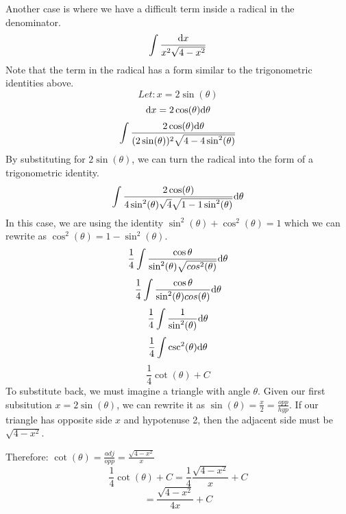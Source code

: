 \documentclass{math}
\begin{document}
Another case is where we have a difficult term inside a radical in the
denominator.
\[ \int{\frac{\mathrm{d}{x}}{x^{2}\sqrt{4-x^{2}}}} \]
Note that the term in the radical has a form similar to the trigonometric
identities above.
\[ Let: x = 2\sin(\theta) \]
\[ \mathrm{d}{x} = 2\cos(\theta)\mathrm{d}{\theta} \]
\[ \int{\frac{2\cos(\theta)\mathrm{d}{\theta}}
   {(2\sin(\theta))^{2}\sqrt{4-4\sin^{2}(\theta)}}} \]
By substituting for \( 2\sin(\theta) \), we can turn the radical into the form
of a trigonometric identity.
\[ \int{\frac{2\cos(\theta)}
  {4\sin^{2}(\theta)\sqrt{4}\sqrt{1-1\sin^{2}(\theta)}}\mathrm{d}{\theta}} \]
In this case, we are using the identity
\( \sin^{2}(\theta)+\cos^{2}(\theta) = 1 \) which we can rewrite as
\( \cos^{2}(\theta) = 1-\sin^{2}(\theta) \).
\[ \frac{1}{4}\int{\frac{\cos{\theta}}
   {\sin^{2}(\theta)\sqrt{cos^{2}(\theta)}}\mathrm{d}{\theta}} \]
\[ \frac{1}{4}\int{\frac{\cos{\theta}}
    {\sin^{2}(\theta)cos(\theta)}\mathrm{d}{\theta}} \]
\[ \frac{1}{4}\int{\frac{1}{\sin^{2}(\theta)}\mathrm{d}{\theta}} \]
\[ \frac{1}{4}\int{\csc^{2}(\theta)\mathrm{d}{\theta}} \]
\[ \frac{1}{4}\cot(\theta)+C \]
To substitute back, we must imagine a triangle with angle \( \theta \). Given
our first subsitution \( x = 2\sin(\theta) \), we can rewrite it as
\( \sin(\theta) = \frac{x}{2} = \frac{opp}{hyp} \). If our triangle has opposite
side \( x \) and hypotenuse 2, then the adjacent side must be
\( \sqrt{4-x^{2}} \).
\begin{center}
\end{center}
Therefore: \( \cot(\theta) = \frac{adj}{opp} = \frac{\sqrt{4-x^{2}}}{x} \)
\[ \frac{1}{4}\cot(\theta)+C = \frac{1}{4}\frac{\sqrt{4-x^{2}}}{x}+C \]
\[ = \frac{\sqrt{4-x^{2}}}{4x}+C \]
\end{document}
